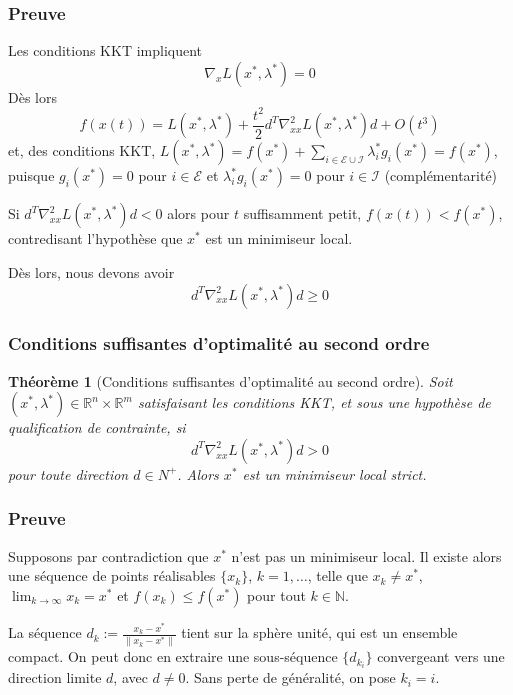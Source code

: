 \documentclass[usepdftitle=false,aspectratio=169]{beamer}
\newtheorem{thm}{Théorème}
\def\cE{\mathcal{E}}
\def\cI{\mathcal{I}}
\def\NN{\mathbb{N}}
\def\RR{\mathbb{R}}
\begin{document}
\begin{frame}
\frametitle{Preuve}

Les conditions KKT impliquent
$$
\nabla_x L(x^*, \lambda^*) = 0
$$
Dès lors
$$
f(x(t)) = L(x^*, \lambda^*) + \frac{t^2}{2} d^T \nabla_{xx}^2 L(x^*, \lambda^*) d + O(t^3)
$$
et, des conditions KKT, $L(x^*, \lambda^*) = f(x^*) + \sum_{i \in \cE \cup \cI} \lambda_i^* g_i(x^*) = f(x^*)$,
puisque $g_i(x^*) = 0$ pour $i \in \cE$ et $\lambda_i^* g_i(x^*) = 0$ pour $i \in \cI$ (complémentarité)

\mbox{}

Si $d^T \nabla_{xx}^2 L(x^*, \lambda^*) d < 0$ alors pour $t$ suffisamment petit, $f(x(t)) < f(x^*)$, contredisant l'hypothèse que $x^*$ est un minimiseur local.

\mbox{}

Dès lors, nous devons avoir
$$
d^T \nabla_{xx}^2 L(x^*, \lambda^*) d \geq 0
$$

\end{frame}

\begin{frame}
\frametitle{Conditions suffisantes d'optimalité au second ordre}

\begin{thm}[Conditions suffisantes d'optimalité au second ordre]
Soit $(x^*, \lambda^*) \in \RR^n \times \RR^m$ satisfaisant les conditions KKT, et sous une hypothèse de qualification de contrainte, si
$$
d^T \nabla^2_{xx} L(x^*, \lambda^*)d > 0
$$
pour toute  direction $d \in N^+$.
Alors $x^*$ est un minimiseur local strict.
\end{thm}

\end{frame}

\begin{frame}
\frametitle{Preuve}

Supposons par contradiction que $x^*$ n'est pas un minimiseur local.
Il existe alors une séquence de points réalisables $\{ x_k \}$, $k = 1,\ldots$, telle que
$x_k \ne x^*$, $\lim_{k \rightarrow \infty} x_k = x^*$ et $f(x_k) \leq f(x^*)$ pour tout $k \in \NN$.

\mbox{}

La séquence $d_k := \frac{x_k-x^*}{\| x_k-x^* \|}$ tient sur la sphère unité, qui est un ensemble compact.
On peut donc en extraire une sous-séquence $\{ d_{k_i} \}$ convergeant vers une direction limite $d$, avec $d \ne 0$.
Sans perte de généralité, on pose $k_i = i$.

\end{frame}
\end{document}
